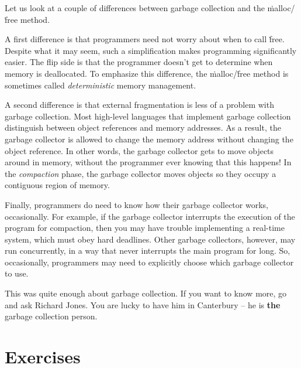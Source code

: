 Let us look at a couple of differences
  between garbage collection and the \.{malloc}\slash\.{free} method.

A first difference is that programmers need not worry about when to call \.{free}.
Despite what it may seem,
  such a simplification makes programming significantly easier.
The flip side is that
  the programmer doesn't get to determine when memory is deallocated.
To emphasize this difference,
  the \.{malloc}\slash\.{free} method
  is sometimes called \emph{deterministic} memory management.


A second difference is that external fragmentation is less of a problem
  with garbage collection.
Most high-level languages that implement garbage collection
  distinguish between object references and memory addresses.
As a result,
  the garbage collector is allowed to change the memory address
  without changing the object reference.
In other words, the garbage collector gets to move objects around in memory,
  without the programmer ever knowing that this happens!
In the \emph{compaction} phase,
  the garbage collector moves objects so they occupy a contiguous region of memory.

Finally, programmers do need to know how their garbage collector works,
  occasionally.
For example,
  if the garbage collector interrupts the execution of the program for compaction,
  then you may have trouble implementing a real-time system,
  which must obey hard deadlines.
Other garbage collectors, however, may run concurrently,
  in a way that never interrupts the main program for long.
So, occasionally, programmers may need to explicitly choose
  which garbage collector to use.

This was quite enough about garbage collection.
If you want to know more, go and ask Richard Jones.
You are lucky to have him in Canterbury --
  he is {\bf the} garbage collection person.

\section{Exercises}


